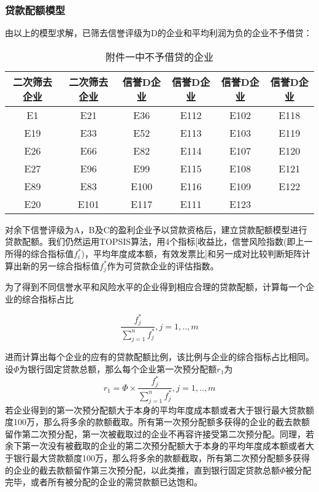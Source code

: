 \documentclass{cumcmthesis}
\begin{document}
\subsubsection{贷款配额模型}
由以上的模型求解，已筛去信誉评级为D的企业和平均利润为负的企业不予借贷：

\begin{table}[H]   %
	\caption{附件一中不予借贷的企业}\label{tab:17} \centering
	\begin{tabular}{cccccc}
		\toprule[1.5pt]
		二次筛去企业 & 二次筛去企业 &信誉D企业&信誉D企业&信誉D企业&信誉D企业\\
		\midrule[1pt]
E1 & E21 &E36 & E112 &E102 & E118 \\ 
E19 & E33 &E52 & E113& E103 & E119\\ 
E26 & E66 &E82 & E114 &E107 & E120 \\ 
E27 & E96 &E99 & E115 & E108 & E121\\ 
E89 & E83 &E100 & E116 &E109 & E122\\ 
E20 & E101 & E117 & E111 & E123&   \\ 
		\bottomrule[1.5pt]
	\end{tabular}
\end{table}

对余下信誉评级为A，B及C的盈利企业予以贷款资格后，建立贷款配额模型进行贷款配额。我们仍然运用TOPSIS算法，用4个指标[收益比，信誉风险指数(即上一所得的综合指标值$f_i^*$)，平均年度成本额，有效发票比]和另一成对比较判断矩阵计算出新的另一综合指标值$f_j^*$作为可贷款企业的评估指数。

为了得到不同信誉水平和风险水平的企业得到相应合理的贷款配额，计算每一个企业的综合指标占比

\begin{equation}
\frac{f_j^*}{\sum_{j=1}^n f_j^*},j=1,..,m
\label{eq:zhibiaobi}
\end{equation}


进而计算出每个企业的应有的贷款配额比例，该比例与企业的综合指标占比相同。设$\Phi$为银行固定贷款总额，那么每个企业第一次预分配额$r_1$为
\begin{equation}
r_1=\Phi\times\frac{f_j^*}{\sum_{j=1}^n f_j^*},j=1,..,m
\end{equation}
若企业得到的第一次预分配额大于本身的平均年度成本额或者大于银行最大贷款额度100万，那么将多余的款额截取。所有第一次预分配额多获得的企业的截去款额留作第二次预分配，第一次被截取过的企业不再容许接受第二次预分配。同理，若余下第一次没有被截取的企业的第二次预分配额大于本身的平均年度成本额或者大于银行最大贷款额度100万，那么将多余的款额截取，所有第二次预分配额多获得的企业的截去款额留作第三次预分配，以此类推，直到银行固定贷款总额$\Phi$被分配完毕，或者所有被分配的企业的需贷款额已达饱和。
\end{document}
